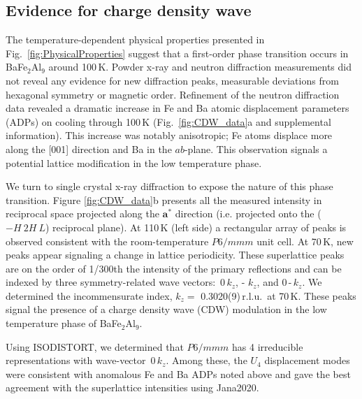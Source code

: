 \documentclass[journal=cmatex,manuscript=article]{achemso}
\begin{document}
\subsection{Evidence for charge density wave}
\label{sec:Results_CDW}

The temperature-dependent physical properties presented in Fig.~\ref{fig:PhysicalProperties} suggest that a first-order phase transition occurs in BaFe$_2$Al$_9$ around 100\,K. Powder x-ray and neutron diffraction measurements did not reveal any evidence for new diffraction peaks, measurable deviations from hexagonal symmetry or magnetic order. Refinement of the neutron diffraction data revealed a dramatic increase in Fe and Ba atomic displacement parameters (ADPs) on cooling through 100\,K (Fig.~\ref{fig:CDW_data}a and supplemental information). This increase was notably anisotropic; Fe atoms displace more along the [001] direction and Ba in the $ab$-plane. This observation signals a potential lattice modification in the low temperature phase.

\label{sec:Results_scXRD}
We turn to single crystal x-ray diffraction to expose the nature of this phase transition. Figure \ref{fig:CDW_data}b presents all the measured intensity in reciprocal space projected along the $\bm{a}^*$ direction (i.e. projected onto the ($-H\ 2H\ L$) reciprocal plane). At 110\,K (left side) a rectangular array of peaks is observed consistent with the room-temperature $P6/mmm$ unit cell. At 70\,K, new peaks appear signaling a change in lattice periodicity. These superlattice peaks are on the order of 1/300th the intensity of the primary reflections and can be indexed by three symmetry-related wave vectors: \textonehalf\,0\,$k_z$, -\textonehalf\,\textonehalf\,$k_z$, and 0\,-\textonehalf\,$k_z$. We determined the incommensurate index, $k_z =$ 0.3020(9)\,r.l.u.~at 70\,K. These peaks signal the presence of a charge density wave (CDW) modulation in the low temperature phase of BaFe$_2$Al$_9$.

Using ISODISTORT, we determined that $P6/mmm$ has 4 irreducible representations with wave-vector \textonehalf\,0\,$k_z$. \cite{ISODISTORT_6.7.2,Campbell2006_ISODISPLACE} Among these, the $U_4$ displacement modes were consistent with anomalous Fe and Ba ADPs noted above and gave the best agreement with the superlattice intensities using Jana2020.
\end{document}
